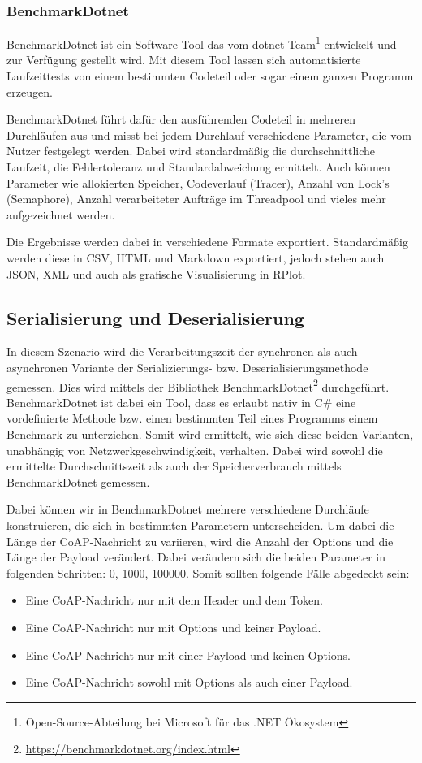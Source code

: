 \subsubsection{BenchmarkDotnet}
\label{BenchmarkDotnet}

BenchmarkDotnet ist ein Software-Tool das vom dotnet-Team\footnote{Open-Source-Abteilung bei Microsoft für das .NET Ökosystem} entwickelt und zur Verfügung gestellt wird. Mit diesem Tool lassen sich automatisierte Laufzeittests von einem bestimmten Codeteil oder sogar einem ganzen Programm erzeugen.

BenchmarkDotnet führt dafür den ausführenden Codeteil in mehreren Durchläufen aus und misst bei jedem Durchlauf verschiedene Parameter, die vom Nutzer festgelegt werden. Dabei wird standardmäßig die durchschnittliche Laufzeit, die Fehlertoleranz und Standardabweichung ermittelt. Auch können Parameter wie allokierten Speicher, Codeverlauf (Tracer), Anzahl von Lock's (Semaphore), Anzahl verarbeiteter Aufträge im Threadpool und vieles mehr aufgezeichnet werden.

Die Ergebnisse werden dabei in verschiedene Formate exportiert. Standardmäßig werden diese in CSV, HTML und Markdown exportiert, jedoch stehen auch JSON, XML und auch als grafische Visualisierung in RPlot.

\subsection{Serialisierung und Deserialisierung}
\label{subsec:serializierung-und-deserializierung}

In diesem Szenario wird die Verarbeitungszeit der synchronen als auch asynchronen Variante der Serializierungs- bzw. Deserialisierungsmethode gemessen. Dies wird mittels der Bibliothek BenchmarkDotnet\footnote{\href{https://benchmarkdotnet.org/index.html}{https://benchmarkdotnet.org/index.html}} durchgeführt. BenchmarkDotnet ist dabei ein Tool, dass es erlaubt nativ in C\# eine vordefinierte Methode bzw. einen bestimmten Teil eines Programms einem Benchmark zu unterziehen. Somit wird ermittelt, wie sich diese beiden Varianten, unabhängig von Netzwerkgeschwindigkeit, verhalten. Dabei wird sowohl die ermittelte Durchschnittszeit als auch der Speicherverbrauch mittels BenchmarkDotnet gemessen.

Dabei können wir in BenchmarkDotnet mehrere verschiedene Durchläufe konstruieren, die sich in bestimmten Parametern unterscheiden. Um dabei die Länge der CoAP-Nachricht zu variieren, wird die Anzahl der Options und die Länge der Payload verändert. Dabei verändern sich die beiden Parameter in folgenden Schritten: 0, 1000, 100000. Somit sollten folgende Fälle abgedeckt sein:
\begin{itemize}
    \item Eine CoAP-Nachricht nur mit dem Header und dem Token.
    \item Eine CoAP-Nachricht nur mit Options und keiner Payload.
    \item Eine CoAP-Nachricht nur mit einer Payload und keinen Options.
    \item Eine CoAP-Nachricht sowohl mit Options als auch einer Payload.
\end{itemize}

